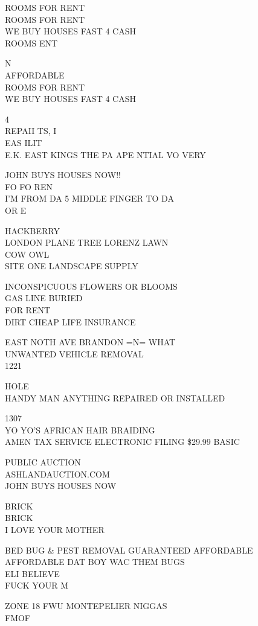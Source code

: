 \documentclass[10pt,letterpaper]{article}
\begin{document}
ROOMS FOR RENT\\
ROOMS FOR RENT\\
WE BUY HOUSES FAST 4 CASH\\
ROOMS ENT

N\\
AFFORDABLE\\
ROOMS FOR RENT\\
WE BUY HOUSES FAST 4 CASH

4\\
REPAII TS, I\\
EAS ILIT\\
E.K. EAST KINGS THE PA APE NTIAL VO VERY

JOHN BUYS HOUSES NOW!!\\
FO FO REN\\
I'M FROM DA 5 MIDDLE FINGER TO DA\\
OR E

HACKBERRY\\
LONDON PLANE TREE LORENZ LAWN\\
COW OWL\\
SITE ONE LANDSCAPE SUPPLY

INCONSPICUOUS FLOWERS OR BLOOMS\\
GAS LINE BURIED\\
FOR RENT\\
DIRT CHEAP LIFE INSURANCE

EAST NOTH AVE BRANDON =N= WHAT\\
UNWANTED VEHICLE REMOVAL\\
1221

HOLE\\
HANDY MAN ANYTHING REPAIRED OR INSTALLED

1307\\
YO YO'S AFRICAN HAIR BRAIDING\\
AMEN TAX SERVICE ELECTRONIC FILING \$29.99 BASIC

PUBLIC AUCTION\\
ASHLANDAUCTION.COM\\
JOHN BUYS HOUSES NOW

BRICK\\
BRICK\\
I LOVE YOUR MOTHER

BED BUG \& PEST REMOVAL GUARANTEED AFFORDABLE AFFORDABLE DAT BOY WAC THEM BUGS\\
ELI BELIEVE\\
FUCK YOUR M

ZONE 18 FWU MONTEPELIER NIGGAS\\
FMOF
\end{document}

